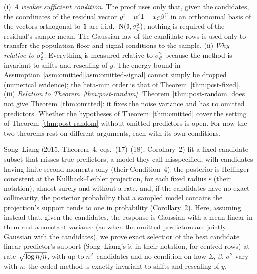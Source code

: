 \begin{remark}\label{rem:omitted-asm}
(i) \emph{A weaker sufficient condition.} The proof uses only that, given the candidates, the coordinates of the residual
vector $y^{\mathrm r}-\alpha'\mathbf{1}-x_{\mathcal C}\beta^{\mathcal C}$ in an orthonormal basis of the vectors orthogonal to $\mathbf{1}$ are
i.i.d.\ $\mathrm{N}(0,\sigma^2_{\mathcal C})$; nothing is required of the residual's sample mean. The Gaussian law of the
candidate rows is used only to transfer the population floor and signal conditions to the sample.
(ii) \emph{Why relative to $\sigma^2_{\mathcal C}$.} Everything is measured relative to $\sigma^2_{\mathcal C}$ because
the method is invariant to shifts and rescaling of $y$. The energy bound in
Assumption~\ref{asm:omitted}\ref{asm:omitted-signal} cannot simply be dropped (numerical evidence); the beta-min order is
that of Theorem~\ref{thm:post-fixed}.
(iii) \emph{Relation to Theorem~\ref{thm:post-random}.} Theorem~\ref{thm:post-random} does not give
Theorem~\ref{thm:omitted}: it fixes the noise variance and has no omitted predictors. Whether the hypotheses of
Theorem~\ref{thm:omitted} cover the setting of Theorem~\ref{thm:post-random} without omitted predictors is open. For now the two
theorems rest on different arguments, each with its own conditions.
\end{remark}

\begin{remark}\label{rem:SL-omitted}
Song--Liang (2015, Theorem~4, eqs.~(17)--(18); Corollary~2) fit a fixed candidate subset that misses true predictors, a
model they call misspecified, with candidates having finite second moments only (their Condition~4): the posterior is
Hellinger-consistent at the Kullback--Leibler projection, for each fixed radius $\varepsilon$ (their notation), almost surely and without a rate,
and, if the candidates have no exact collinearity, the posterior probability that a sampled model contains the
projection's support tends to one in probability (Corollary~2). Here, assuming instead that, given the candidates, the
response is Gaussian with a mean linear in them and a constant variance (as when the omitted predictors are jointly
Gaussian with the candidates), we prove exact selection of the best candidate linear predictor's support (Song--Liang's
$\tilde s$, in their notation, for centred rows) at rate $\sqrt{\log n/n}$, with up to $n^A$ candidates and no condition on how $\Sigma$, $\beta$,
$\sigma^2$ vary with $n$; the coded method is exactly invariant to shifts and rescaling of $y$.
\end{remark}
